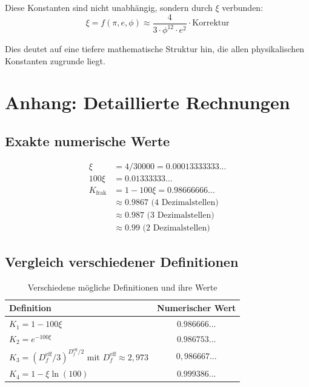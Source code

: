 	Diese Konstanten sind nicht unabhängig, sondern durch $\xi$ verbunden:
	\begin{equation}
		\xi = f(\pi, e, \phi) \approx \frac{4}{3 \cdot \phi^{12} \cdot e^2} \cdot \text{Korrektur}
	\end{equation}
	
	Dies deutet auf eine tiefere mathematische Struktur hin, die allen physikalischen Konstanten zugrunde liegt.
	
	\section{Anhang: Detaillierte Rechnungen}
	
	\subsection{Exakte numerische Werte}
	
	\begin{align}
		\xi &= 4/30000 = 0.00013333333... \\
		100\xi &= 0.01333333... \\
		K_{\text{frak}} &= 1 - 100\xi = 0.98666666... \\
		&\approx 0.9867 \text{ (4 Dezimalstellen)} \\
		&\approx 0.987 \text{ (3 Dezimalstellen)} \\
		&\approx 0.99 \text{ (2 Dezimalstellen)}
	\end{align}
	
	\subsection{Vergleich verschiedener Definitionen}
	
	\begin{table}[h]
		\centering
		\begin{tabular}{lc}
			\toprule
			\textbf{Definition} & \textbf{Numerischer Wert} \\
			\midrule
			$K_1 = 1 - 100\xi$ & $0.986666...$ \\
			$K_2 = e^{-100\xi}$ & $0.986753...$ \\
			$K_3 = (D_f^{\text{eff}}/3)^{D_f^{\text{eff}}/2}$ mit $D_f^{\text{eff}} \approx 2{,}973$ & $0{,}986667...$ \\
			$K_4 = 1 - \xi \ln(100)$ & $0.999386...$ \\
			\bottomrule
		\end{tabular}
		\caption{Verschiedene mögliche Definitionen und ihre Werte}
	\end{table}
	
